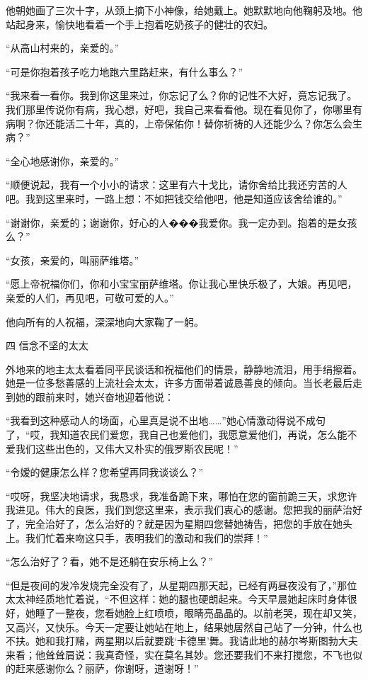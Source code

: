 \par 他朝她画了三次十字，从颈上摘下小神像，给她戴上。她默默地向他鞠躬及地。他站起身来，愉快地看着一个手上抱着吃奶孩子的健壮的农妇。
\par “从高山村来的，亲爱的。”
\par “可是你抱着孩子吃力地跑六里路赶来，有什么事么？”
\par “我来看一看你。我到你这里来过，你忘记了么？你的记性不大好，竟忘记我了。我们那里传说你有病，我心想，好吧，我自己来看看他。现在看见你了，你哪里有病啊？你还能活二十年，真的，上帝保佑你！替你祈祷的人还能少么？你怎么会生病？”
\par “全心地感谢你，亲爱的。”
\par “顺便说起，我有一个小小的请求：这里有六十戈比，请你舍给比我还穷苦的人吧。我到这里来时，一路上想：不如把钱交给他吧，他是知道应该舍给谁的。”
\par “谢谢你，亲爱的；谢谢你，好心的人���我爱你。我一定办到。抱着的是女孩么？”
\par “女孩，亲爱的，叫丽萨维塔。”
\par “愿上帝祝福你们，你和小宝宝丽萨维塔。你让我心里快乐极了，大娘。再见吧，亲爱的人们，再见吧，可敬可爱的人。”
\par 他向所有的人祝福，深深地向大家鞠了一躬。
\par 四 信念不坚的太太
\par 外地来的地主太太看着同平民谈话和祝福他们的情景，静静地流泪，用手绢擦着。她是一位多愁善感的上流社会太太，许多方面带着诚恳善良的倾向。当长老最后走到她的跟前来时，她兴奋地迎着他说：
\par “我看到这种感动人的场面，心里真是说不出地……”她心情激动得说不成句了，“哎，我知道农民们爱您，我自己也爱他们，我愿意爱他们，再说，怎么能不爱我们这些出色的，又伟大又朴实的俄罗斯农民呢！”
\par “令嫒的健康怎么样？您希望再同我谈谈么？”
\par “哎呀，我坚决地请求，我恳求，我准备跪下来，哪怕在您的窗前跪三天，求您许我进见。伟大的良医，我们到您这里来，表示我们衷心的感谢。您把我的丽萨治好了，完全治好了，怎么治好的？就是因为星期四您替她祷告，把您的手放在她头上。我们忙着来吻这只手，表明我们的激动和我们的崇拜！”
\par “怎么治好了？看，她不是还躺在安乐椅上么？”
\par “但是夜间的发冷发烧完全没有了，从星期四那天起，已经有两昼夜没有了，”那位太太神经质地忙着说，“不但这样：她的腿也硬朗起来。今天早晨她起床时身体很好，她睡了一整夜，您看她脸上红喷喷，眼睛亮晶晶的。以前老哭，现在却又笑，又高兴，又快乐。今天一定要让她站在地上，结果她居然自己站了一分钟，什么也不扶。她和我打赌，两星期以后就要跳‘卡德里’舞。我请此地的赫尔岑斯图勃大夫来看；他耸耸肩说：我真奇怪，实在莫名其妙。您还要我们不来打搅您，不飞也似的赶来感谢你么？丽萨，你谢呀，道谢呀！”
